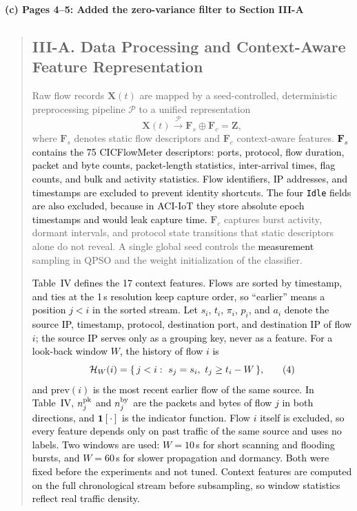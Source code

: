 \documentclass[11pt]{article}
\newenvironment{excerpt}{\begin{quote}\sloppy}{\end{quote}}
\newcommand{\mshead}[2]{\subsection*{\textbf{#1. #2}}}
\newcommand{\loc}[1]{\par\medskip\noindent\textbf{#1}\par}
\begin{document}
\loc{(c) Pages 4--5: Added the zero-variance filter to Section III-A}
\begin{excerpt}
\mshead{III-A}{Data Processing and Context-Aware Feature Representation}


Raw flow records $\mathbf{X}(t)$ are mapped by a seed-controlled,
deterministic preprocessing pipeline $\mathcal{P}$ to a unified
representation
\begin{equation}
\mathbf{X}(t) \xrightarrow{\mathcal{P}}
\mathbf{F}_s \oplus \mathbf{F}_c = \mathbf{Z},
\tag{3}
\end{equation}
where $\mathbf{F}_s$ denotes static flow descriptors and
$\mathbf{F}_c$ context-aware features.
\textcolor{black}{$\mathbf{F}_s$ contains the 75 CICFlowMeter
descriptors: ports, protocol, flow duration, packet and byte counts,
packet-length statistics, inter-arrival times, flag counts, and bulk
and activity statistics. Flow identifiers, IP addresses, and
timestamps are excluded to prevent identity shortcuts. The four
\texttt{Idle} fields are also excluded, because in ACI-IoT they store
absolute epoch timestamps and would leak capture time.}
$\mathbf{F}_c$ captures burst activity, dormant intervals, and
protocol state transitions that static descriptors alone do not
reveal. A single global seed controls the
\textcolor{black}{measurement} sampling in QPSO and the
weight initialization of the classifier.

\textcolor{black}{Table~IV defines
the 17 context features. Flows are sorted by timestamp, and ties at
the 1\,s resolution keep capture order, so ``earlier'' means a
position $j<i$ in the sorted stream. Let $s_i$, $t_i$, $\pi_i$,
$p_i$, and $a_i$ denote the source IP, timestamp, protocol,
destination port, and destination IP of flow $i$; the source IP
serves only as a grouping key, never as a feature. For a look-back
window $W$, the history of flow $i$ is}
\begin{equation}
\textcolor{black}{\mathcal{H}_W(i)=\{\,j<i:\ s_j=s_i,\ t_j\ge t_i-W\,\},}
\tag{4}
\end{equation}
\textcolor{black}{and $\mathrm{prev}(i)$ is the most recent
earlier flow of the same source. In Table~IV,
$n^{\rm pk}_j$ and $n^{\rm by}_j$ are the packets and bytes of flow
$j$ in both directions, and $\mathbf{1}[\cdot]$ is the indicator
function. Flow $i$ itself is excluded, so
every feature depends only on past traffic of the same source and
uses no labels. Two windows are used: $W=10$\,s for short scanning
and flooding bursts, and $W=60$\,s for slower propagation and
dormancy. Both were fixed before the experiments and not tuned.
Context features are computed on the full chronological stream
before subsampling, so window statistics reflect real traffic
density.}


\end{excerpt}
\end{document}
